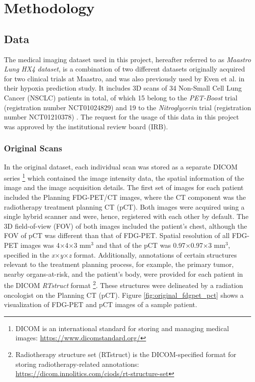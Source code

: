 \chapter{Methodology}
\label{Methodology}



\section{Data}
The medical imaging dataset used in this project, hereafter referred to as \textit{Maastro Lung HX4 dataset}, is a combination of two different datasets originally acquired for two clinical trials at Maastro, and was also previously used by Even et al. \cite{even2017predicting} in their hypoxia prediction study. It includes 3D scans of 34 Non-Small Cell Lung Cancer (NSCLC) patients in total, of which 15 belong to the \textit{PET-Boost} trial (registration number NCT01024829) \cite{van2012pet} and 19 to the \textit{Nitroglycerin} trial (registration number NCT01210378) \cite{even2017predicting}. The request for the usage of this data in this project was approved by the institutional review board (IRB).


\subsection{Original Scans}
\label{Original_Scans}
In the original dataset, each individual scan was stored as a separate DICOM series \footnote{DICOM is an international standard for storing and managing medical images: \url{https://www.dicomstandard.org/}} which contained the image intensity data, the spatial information of the image and the image acquisition details. The first set of images for each patient included the Planning FDG-PET/CT images, where the CT component was the radiotherapy treatment planning CT (pCT). Both images were acquired using a single hybrid scanner and were, hence, registered with each other by default. The 3D field-of-view (FOV) of both images included the patient's chest, although the FOV of pCT was different than that of FDG-PET. Spatial resolution of all FDG-PET images was 4$\times$4$\times$3 mm$^3$ and that of the pCT was 0.97$\times$0.97$\times$3 mm$^3$, specified in the \textit{x}$\times$\textit{y}$\times$\textit{z} format. Additionally, annotations of certain structures relevant to the treatment planning process, for example, the primary tumor, nearby organs-at-risk, and the patient's body, were provided for each patient in the DICOM \textit{RTstruct} format \footnote{Radiotherapy structure set (RTstruct) is the DICOM-specified format for storing radiotherapy-related annotations: \url{https://dicom.innolitics.com/ciods/rt-structure-set}}. These structures were delineated by a radiation oncologist on the Planning CT (pCT). Figure \ref{fig:original_fdgpet_pct} shows a visualization of FDG-PET and pCT images of a sample patient.

